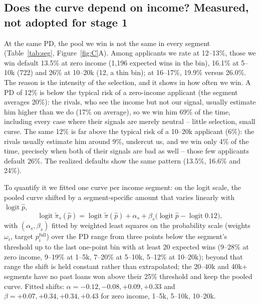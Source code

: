 \documentclass[11pt,a4paper]{article}
\begin{document}
\subsection{Does the curve depend on income? Measured, not adopted for stage 1}
At the same PD, the pool we win is not the same in every segment (Table~\ref{tab:seg}, Figure~\ref{fig:C}A). Among
applicants we rate at 12--13\%, those we win default 13.5\% at zero income (1,196 expected wins in the bin), 16.1\% at
5--10k (722) and 26\% at 10--20k (12, a thin bin); at 16--17\%, 19.9\% versus 26.0\%. The reason is the intensity of the
selection, and it shows in how often we win. A PD of 12\% is below the typical risk of a zero-income applicant (the
segment averages 20\%): the rivals, who see the income but not our signal, usually estimate him higher than we do (17\%
on average), so we win him 69\% of the time, including every case where their signals are merely neutral -- little
selection, small curse. The same 12\% is far above the typical risk of a 10--20k applicant (6\%): the rivals usually
estimate him around 9\%, undercut us, and we win only 4\% of the time, precisely when both of their signals are bad as
well -- those few applicants default 26\%. The realized defaults show the same pattern (13.5\%, 16.6\% and 24\%).

To quantify it we fitted one curve per income segment: on the logit scale, the pooled curve shifted by a
segment-specific amount that varies linearly with $\operatorname{logit}\hat p$,
\begin{equation}
\operatorname{logit}\tilde\pi_s(\hat p) = \operatorname{logit}\tilde\pi(\hat p) + \alpha_s + \beta_s\big(\operatorname{logit}\hat p - \operatorname{logit}0.12\big),
\end{equation}
with $(\alpha_s,\beta_s)$ fitted by weighted least squares on the probability scale (weights $\omega_i$, target
$p^{\text{full}}_i$) over the PD range from three points below the segment's threshold up to the last one-point bin with
at least 20 expected wins (9--28\% at zero income, 9--19\% at 1--5k, 7--20\% at 5--10k, 5--12\% at 10--20k); beyond
that range the shift is held constant rather than extrapolated; the 20--40k and 40k+ segments have no past loans won
above their 25\% threshold and keep the pooled curve. Fitted shifts: $\alpha = -0.12, -0.08, +0.09, +0.33$ and
$\beta = +0.07, +0.34, +0.34, +0.43$ for zero income, 1--5k, 5--10k, 10--20k.
\end{document}
